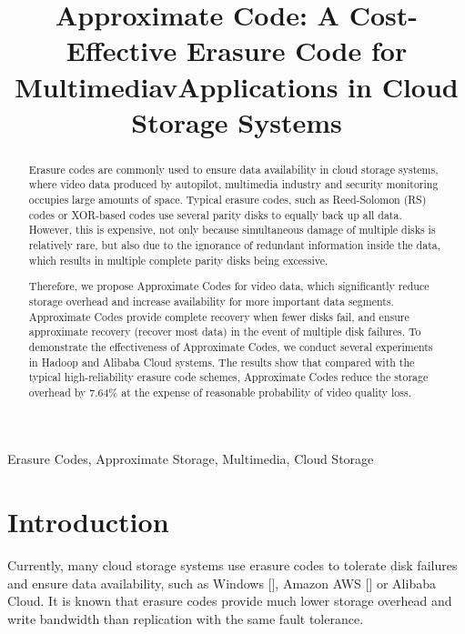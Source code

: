 \documentclass[conference]{IEEEtran}
\begin{document}
\title{\LARGE{Approximate Code: A Cost-Effective Erasure Code for MultimediavApplications in Cloud Storage Systems}\\
}
\author{
}

\maketitle

\begin{abstract}
Erasure codes are commonly used to ensure data availability in cloud storage systems, where video data produced by autopilot, multimedia industry and security monitoring occupies large amounts of space.
Typical erasure codes, such as Reed-Solomon (RS) \cite{macwilliams1977theory} codes or XOR-based codes use several parity disks to equally back up all data.
However, this is expensive, not only because simultaneous damage of multiple disks is relatively rare, but also due to the ignorance of redundant information inside the data, which results in multiple complete parity disks being excessive.


Therefore, we propose Approximate Codes for video data, which significantly reduce storage overhead and increase availability for more important data segments.
Approximate Codes provide complete recovery when fewer disks fail, and ensure approximate recovery (recover most data) in the event of multiple disk failures.
To demonstrate the effectiveness of Approximate Codes, we conduct several experiments in Hadoop and Alibaba Cloud systems.
The results show that compared with the typical high-reliability erasure code schemes, Approximate Codes reduce the storage overhead by 7.64\% at the expense of reasonable probability of video quality loss.

\end{abstract}

\begin{IEEEkeywords}
    Erasure Codes, Approximate Storage, Multimedia, Cloud Storage
\end{IEEEkeywords}

\section{Introduction}
Currently, many cloud storage systems use erasure codes to tolerate disk failures and ensure data availability, such as Windows [], Amazon AWS [] or Alibaba Cloud. It is known that erasure codes provide much lower storage overhead and write bandwidth than replication with the same fault tolerance.
\end{document}
